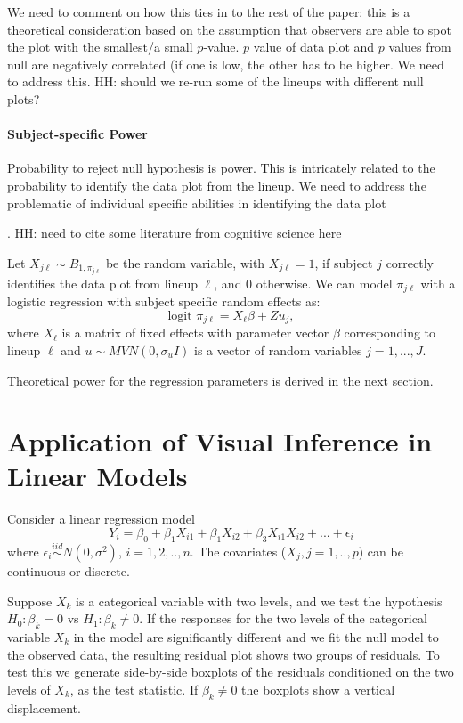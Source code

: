 \documentclass{article}
\newcommand{\blue}[1]{{\color{blue} #1}} %
\newcommand{\red}[1]{{\color{red} #1}} %
\begin{document}
\red{We need to comment on how this ties in to the rest of the paper: this is a theoretical consideration based on the assumption that observers are able to spot the plot with the smallest/a small $p$-value. $p$ value of data plot and $p$ values from null are negatively correlated (if one is low, the other has to be higher. We need to address this.}
\red{HH: should we re-run some of the lineups with different null plots?}

\blue{
\paragraph{Subject-specific Power}
Probability to reject null hypothesis is power. This is intricately related to the probability to identify the data plot from the lineup. We need to address the problematic of individual specific abilities in identifying the data plot
}. 
\red{HH: need to cite some literature from cognitive science here}

\blue{Let $X_{j\ell} \sim B_{1, \pi_{j\ell}}$ be the random variable, with $X_{j\ell}= 1$, if  subject $j$ correctly identifies the data plot from lineup $\ell$, and 0 otherwise.
We can model $\pi_{j\ell}$ with a logistic regression with subject specific random effects as:
\[
\text{logit } \pi_{j\ell} = X_\ell \beta + Z u_j,  
\]
where $X_\ell$ is a matrix of fixed effects with parameter vector $\beta$ corresponding to lineup $\ell$ and $u \sim MVN(0, \sigma_u I)$  is a vector of random variables $j = 1, ..., J$.
}

Theoretical power for the regression parameters is derived in the next section.

\section{Application of Visual Inference in Linear Models} \label{sec:regression}

Consider a linear regression model 
\begin{equation}\label{multi} Y_i = \beta_0 + \beta_1 X_{i1} + \beta_1 X_{i2} + \beta_3 X_{i1}X_{i2} + ... + \epsilon_i 
\end{equation}
where $\epsilon_i \stackrel{iid}{ \sim } N(0,\sigma^2)$, $i=1,2, .., n$. The covariates ($X_j, j=1,..,p$) can be continuous or discrete. 

Suppose $X_k$ is a categorical variable with two levels, and we test the hypothesis $H_0:\beta_k=0$ vs $H_1: \beta_k \ne 0$. If the responses for the two levels of the categorical variable $X_k$ in the model are significantly different and we fit the null model to the observed data, the resulting residual plot shows two groups of residuals. To test this we generate side-by-side boxplots of the residuals conditioned on the two levels of $X_k$, as the test statistic. If $\beta_k\ne 0$ the boxplots show a vertical displacement. 
\end{document}
